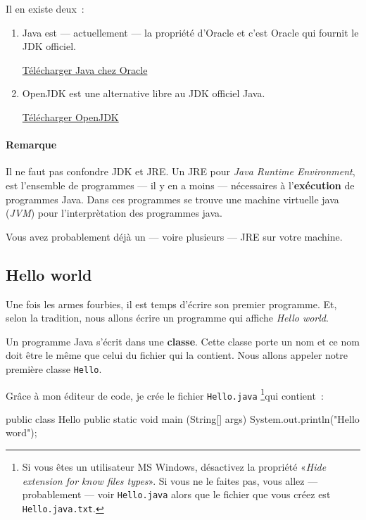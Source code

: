 Il en existe deux~:

\begin{enumerate}
	
	\item Java est — actuellement — la propriété d'Oracle et c'est Oracle qui
		fournit le JDK officiel. 

		\href{http://www.oracle.com/technetwork/java/javase/downloads}
		{Télécharger Java chez Oracle}

	\item OpenJDK est une alternative libre au JDK officiel Java.

		\href{http://openjdk.java.net/}{Télécharger OpenJDK}

\end{enumerate}


\paragraph {Remarque} Il ne faut pas confondre JDK et JRE. Un JRE
pour \textit{Java Runtime Environment}, est l'ensemble de programmes — il y en
a moins — nécessaires à l'\textbf{exécution} de programmes Java. Dans ces
programmes se trouve une machine virtuelle java (\textit{JVM}) pour
l'interprètation des programmes java. 

Vous avez probablement déjà un — voire plusieurs — JRE sur votre machine. 


\subsection{Hello world}

Une fois les armes fourbies, il est temps d'écrire son premier programme. Et,
selon la tradition, nous allons écrire un programme qui affiche \textit{Hello
world}.

Un programme Java s'écrit dans une \textbf{classe}. Cette classe porte un nom et
ce nom doit être le même que celui du fichier qui la contient. Nous allons
appeler notre première classe \texttt{Hello}. 

Grâce à mon éditeur de code, je crée le fichier \texttt{Hello.java}
\footnote{%
	Si vous êtes un utilisateur MS Windows, désactivez la propriété
	«\textit{Hide extension for know files types}». Si vous ne le faites pas,
	vous allez — probablement — voir \texttt{Hello.java} alors que le fichier
	que vous créez est \texttt{Hello.java.txt}.
}qui contient~:

\begin{java}
public class Hello{
	public static void main (String[] args) { 
		System.out.println("Hello word");
	}
}
\end{java}

